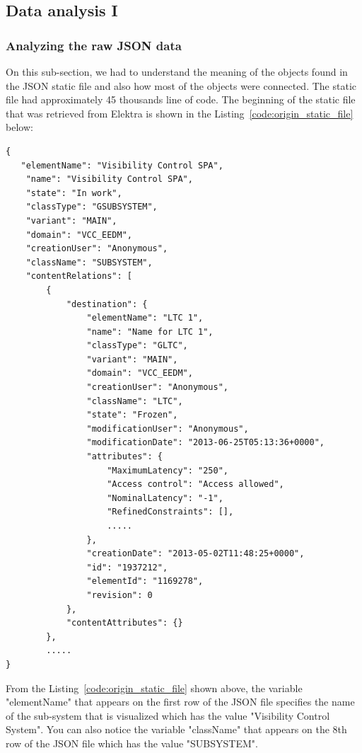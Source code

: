\subsection{Data analysis I}

\subsubsection{Analyzing the raw JSON data}

On this sub-section, we had to understand the meaning of the objects found in the JSON static file and also how most of the objects were connected. The static file had approximately 45 thousands line of code. The beginning of the static file that was retrieved from Elektra is shown in the Listing~\ref{code:origin_static_file} below:

\begin{lstlisting}[caption=A small part of how the original file appear, label=code:origin_static_file]
{
   "elementName": "Visibility Control SPA", 
    "name": "Visibility Control SPA", 
    "state": "In work", 
    "classType": "GSUBSYSTEM", 
    "variant": "MAIN", 
    "domain": "VCC_EEDM", 
    "creationUser": "Anonymous", 
    "className": "SUBSYSTEM", 
    "contentRelations": [
        {
            "destination": {
                "elementName": "LTC 1", 
                "name": "Name for LTC 1", 
                "classType": "GLTC", 
                "variant": "MAIN", 
                "domain": "VCC_EEDM", 
                "creationUser": "Anonymous", 
                "className": "LTC", 
                "state": "Frozen", 
                "modificationUser": "Anonymous", 
                "modificationDate": "2013-06-25T05:13:36+0000", 
                "attributes": {
                    "MaximumLatency": "250", 
                    "Access control": "Access allowed", 
                    "NominalLatency": "-1", 
                    "RefinedConstraints": [], 
                    .....
                }, 
                "creationDate": "2013-05-02T11:48:25+0000", 
                "id": "1937212", 
                "elementId": "1169278", 
                "revision": 0
            }, 
            "contentAttributes": {}
        }, 
        .....   
}
\end{lstlisting}

From the Listing~\ref{code:origin_static_file} shown above, the variable "elementName" that appears on the first row of the JSON file specifies the name of the sub-system that is visualized which has the value "Visibility Control System". You can also notice the variable "className" that appears on the 8th row of the JSON file which has the value "SUBSYSTEM". \\

